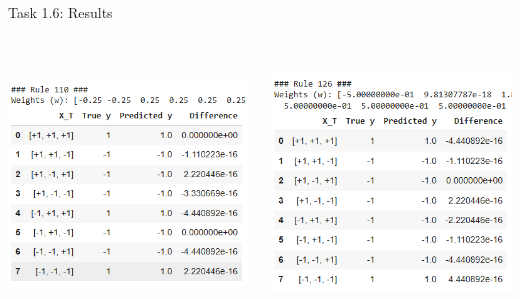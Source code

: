 \documentclass[aspectratio=169]{beamer}
\begin{document}
\begin{frame}{Task 1.6: Results}
\begin{columns}
    \begin{column}{0.5\textwidth}
        \includegraphics[width=07cm, height=07cm]{task_1.6_rule_110.png}
    \end{column}
    \begin{column}{0.5\textwidth}
        \includegraphics[width=07cm, height=07cm]{task_1.6_rule_126.png}
    \end{column}
\end{columns}
\end{frame}
\end{document}
